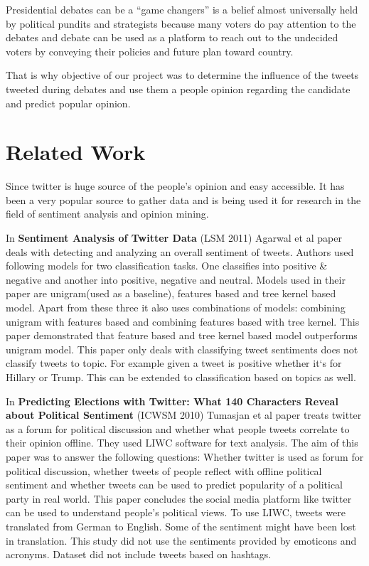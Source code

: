 \documentclass{acm_proc_article-sp}
\begin{document}
Presidential debates can be a ``game changers'' is a belief almost universally held by political pundits and strategists because many voters do pay attention to the debates and debate can be used as a platform to reach out to the undecided voters by conveying their policies and future plan toward country.\cite{aaSides:dpdrm}

That is why objective of our project was to determine the influence of the tweets tweeted during debates and use them a people opinion regarding the candidate and predict popular opinion. 

\section{Related Work}
Since twitter is huge source of the people's opinion and easy accessible. It has been a very popular source to gather data and is  being used it for research in the field of sentiment analysis and opinion mining.\cite{wang:asfrttsa, shamma:ttducaous}

In \textbf{Sentiment Analysis of Twitter Data }(LSM 2011) Agarwal et al \cite{aAgarwal:saotd} paper deals with detecting and analyzing an overall sentiment of tweets. Authors used following models for two classification tasks. One classifies into positive \&
negative and another into positive, negative and neutral. Models used in their paper are unigram(used as a baseline), features based and tree kernel based model. Apart from these three it also uses combinations of models: combining unigram with features based and combining features based with tree kernel. This paper demonstrated that feature based and tree kernel based model outperforms unigram model. This paper only deals with classifying tweet sentiments does not classify tweets to topic. For example given a tweet is positive whether it`s for Hillary or Trump. This can be extended to classification based on topics as well.

In \textbf{Predicting Elections with Twitter: What 140 Characters Reveal about Political Sentiment }(ICWSM 2010) Tumasjan et al \cite{bTumasjan:pewt} paper treats twitter as a forum for political discussion and whether what people tweets correlate to their opinion offline. They used LIWC software for text analysis. The aim of this paper was to answer the following questions: Whether twitter is used as forum for political discussion, whether tweets of people reflect with offline political sentiment and whether tweets can be used to predict popularity of a political party in real world. This paper concludes the social media platform like twitter can be used to understand people's political views. To use LIWC, tweets were translated from German to English. Some of the sentiment might have been lost in translation. This study did not use the sentiments provided by emoticons and acronyms. Dataset did not include tweets based on hashtags.
\end{document}

